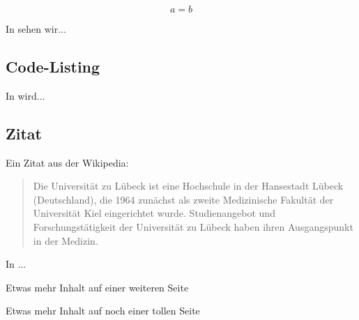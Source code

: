 \documentclass[
	ngerman,
	11pt,
	twoside,
	a4paper,
	headsepline,
	footsepline, 
	toc=bib
]{scrbook}
\begin{document}
\begin{equation}\label{eq:test}
  a=b
\end{equation}

In  sehen wir...

\subsection{Code-Listing}




In  wird...

\subsection{Zitat}

Ein Zitat aus der Wikipedia:

\begin{quote}
	\begin{myquote}
		Die Universität zu Lübeck ist eine Hochschule in der Hansestadt Lübeck (Deutschland), die 1964 zunächst als zweite Medizinische Fakultät der Universität Kiel eingerichtet wurde. Studienangebot und Forschungstätigkeit der Universität zu Lübeck haben ihren Ausgangspunkt in der Medizin.
		\label{quote:uni}
	\end{myquote}
\end{quote}


%
%
In ...


\newpage

Etwas mehr Inhalt auf einer weiteren Seite

\newpage

Etwas mehr Inhalt auf noch einer tollen Seite





	\cleardoublepage
	\newpage
	\setcounter{page}{1}
	\appendix

				\listoffigures

	    \listoftables

		


		\printnomenclature

		\printbibliography

    \printindex
\end{document}
